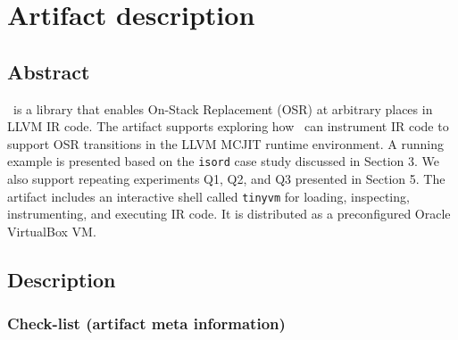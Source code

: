 
%
%



\appendix
\section{Artifact description}


\subsection{Abstract}

\osrkit\ is a library that enables On-Stack Replacement (OSR) at arbitrary places in LLVM IR code. The artifact supports exploring how \osrkit\ can instrument IR code to support OSR transitions in the LLVM MCJIT runtime environment. A running example is presented based on the \texttt{isord} case study discussed in Section 3. We also support repeating experiments Q1, Q2, and Q3 presented in Section 5. The artifact includes an interactive shell called \texttt{tinyvm} for loading, inspecting, instrumenting, and executing IR code. It is distributed as a preconfigured Oracle VirtualBox VM.


\subsection{Description}

\subsubsection{Check-list (artifact meta information)}


